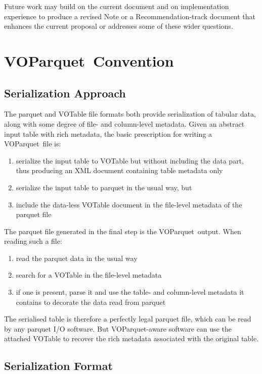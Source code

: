 \documentclass[11pt,a4paper]{ivoa}
\newcommand{\voparquet}{VOParquet}
\begin{document}
Future work may build on the current document and on implementation
experience to produce a revised Note or a Recommendation-track document
that enhances the current proposal or addresses
some of these wider questions.

\section{\voparquet\ Convention}
\label{sec:serialization}

\subsection{Serialization Approach}

The parquet and VOTable file formats both provide serialization
of tabular data, along with some degree of file- and column-level metadata.
Given an abstract input table with rich metadata,
the basic prescription for writing a \voparquet\ file is:
\begin{enumerate}
\item serialize the input table to VOTable but without including the data part,
      thus producing an XML document containing table metadata only
\item serialize the input table to parquet in the usual way, but
\item include the data-less VOTable document in the file-level metadata
      of the parquet file
\end{enumerate}
The parquet file generated in the final step is the \voparquet\ output.
When reading such a file:
\begin{enumerate}
\item read the parquet data in the usual way
\item search for a VOTable in the file-level metadata
\item if one is present, parse it and use the table- and column-level
      metadata it contains to decorate the data read from parquet
\end{enumerate}

The serialised table is therefore a perfectly legal parquet file,
which can be read by any parquet I/O software.
But \voparquet-aware software can use the attached VOTable to recover
the rich metadata associated with the original table.

\subsection{Serialization Format}
\label{sec:format}
\end{document}
